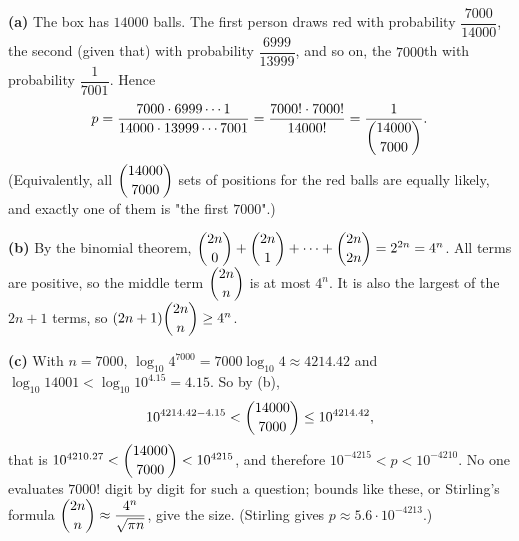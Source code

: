 \textbf{(a)} The box has $14000$ balls. The first person draws red with probability $\dfrac{7000}{14000}$, the second (given that) with probability $\dfrac{6999}{13999}$, and so on, the $7000$th with probability $\dfrac{1}{7001}$. Hence
\[
p=\dfrac{7000\cdot6999\cdots1}{14000\cdot13999\cdots7001}=\dfrac{7000!\cdot7000!}{14000!}=\dfrac{1}{\dbinom{14000}{7000}} .
\]
(Equivalently, all $\dbinom{14000}{7000}$ sets of positions for the red balls are equally likely, and exactly one of them is "the first $7000$".)

\textbf{(b)} By the binomial theorem, $\dbinom{2n}{0}+\dbinom{2n}{1}+\cdots+\dbinom{2n}{2n}=2^{2n}=4^n$. All terms are positive, so the middle term $\dbinom{2n}{n}$ is at most $4^n$. It is also the largest of the $2n+1$ terms, so $(2n+1)\dbinom{2n}{n}\ge4^n$.

\textbf{(c)} With $n=7000$, $\log_{10}4^{7000}=7000\log_{10}4\approx4214.42$ and $\log_{10}14001<\log_{10}10^{4.15}=4.15$. So by (b),
\[
10^{4214.42-4.15}<\dbinom{14000}{7000}\le10^{4214.42},
\]
that is $10^{4210.27}<\dbinom{14000}{7000}<10^{4215}$, and therefore $\boxed{10^{-4215}<p<10^{-4210}}$. No one evaluates $7000!$ digit by digit for such a question; bounds like these, or Stirling's formula $\dbinom{2n}{n}\approx\dfrac{4^n}{\sqrt{\pi n}}$, give the size. (Stirling gives $p\approx5.6\cdot10^{-4213}$.)

